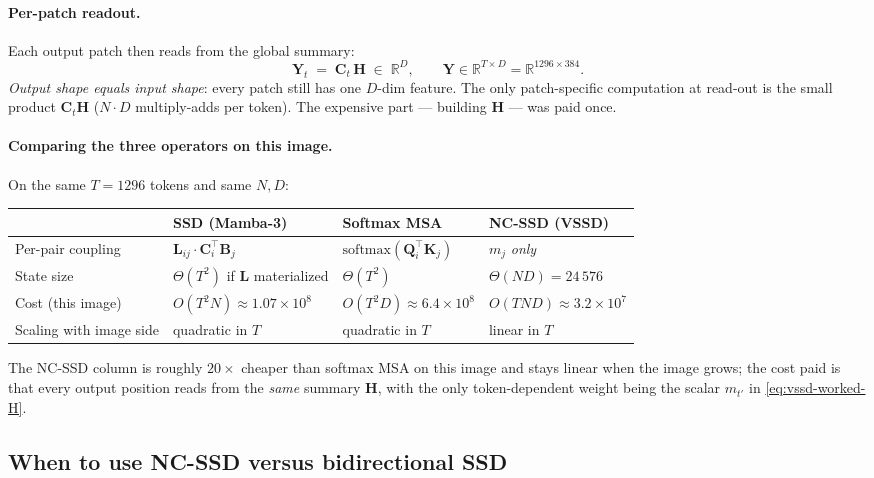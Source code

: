 \documentclass[11pt,a4paper]{article}
\begin{document}
\paragraph{Per-patch readout.}
Each output patch then reads from the global summary:
\begin{equation}\label{eq:vssd-worked-Y}
  \bm{Y}_t \;=\; \bm{C}_t\,\bm{H}
  \;\in\;\mathbb{R}^{D},
  \qquad
  \bm{Y}\in\mathbb{R}^{T\times D} = \mathbb{R}^{1296\times 384}.
\end{equation}
\emph{Output shape equals input shape}: every patch still has one
$D$-dim feature. The only patch-specific computation at read-out is
the small product $\bm{C}_t\bm{H}$ ($N\!\cdot\!D$ multiply-adds per
token). The expensive part — building $\bm{H}$ — was paid once.

\paragraph{Comparing the three operators on this image.}
On the same $T\!=\!1296$ tokens and same $N, D$:
\begin{center}
\begin{tabular}{|l|l|l|l|}
\hline
 & \textbf{SSD (Mamba-3)} & \textbf{Softmax MSA} & \textbf{NC-SSD (VSSD)} \\ \hline
Per-pair coupling      & $\bm{L}_{ij}\!\cdot\!\bm{C}_i^\top\bm{B}_j$ & $\mathrm{softmax}(\bm{Q}_i^\top\bm{K}_j)$ & $m_j$ \emph{only} \\ \hline
State size             & $\Theta(T^2)$ if $\bm{L}$ materialized & $\Theta(T^2)$ & $\Theta(ND) = 24\,576$ \\ \hline
Cost (this image)      & $O(T^2 N) \approx 1.07\!\times\!10^{8}$ & $O(T^2 D) \approx 6.4\!\times\!10^{8}$ & $O(TND) \approx 3.2\!\times\!10^{7}$ \\ \hline
Scaling with image side & quadratic in $T$ & quadratic in $T$ & linear in $T$ \\ \hline
\end{tabular}
\end{center}
The NC-SSD column is roughly $20\times$ cheaper than softmax MSA on
this image and stays linear when the image grows; the cost paid is
that every output position reads from the \emph{same} summary
$\bm{H}$, with the only token-dependent weight being the scalar
$m_{t'}$ in \eqref{eq:vssd-worked-H}.

\subsection{When to use NC-SSD versus bidirectional SSD}
\label{sec:ncssd-when}
\end{document}
